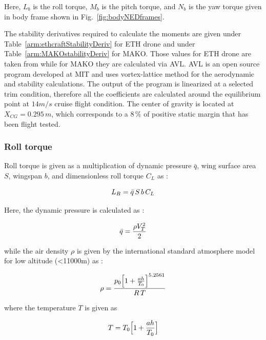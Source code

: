 Here, $L_b$ is the roll torque, $M_b$ is the pitch torque, and $N_b$ is the yaw torque given in body frame shown in Fig.~\ref{fig:bodyNEDframes}.

The stability derivatives required to calculate the moments are given under Table~\ref{arm:ethcraftStabilityDeriv} for ETH drone and under Table~\ref{arm:MAKOstabilityDeriv} for MAKO. 
Those values for ETH drone are taken from \cite{ducard2009fault} while for MAKO they are calculated via AVL. 
AVL is an open source program developed at MIT and uses vortex-lattice method for the aerodynamic and stability calculations.
The output of the program is linearized at a selected trim condition, therefore all the coefficients are calculated around the equilibrium point at $14m/s$ cruise flight condition.
The center of gravity is located at $X_{CG}= 0.295\,m$, which corresponds to a $8\,\%$ of positive static margin that has been flight tested. %

\subsubsection{Roll torque}

Roll torque is given as a multiplication of dynamic pressure $\bar{q}$, wing surface area $S$, wingspan $b$,  and dimensionless roll torque $C_L$ as :

\begin{equation}{\label{eqn:rollTorque}}
L_B = \bar{q} \, S \, b \, C_L
\end{equation}

Here, the dynamic pressure is calculated as :

\begin{equation}{\label{eqn:dynamicPressure}}
\bar{q}=\frac{\rho V_T^2}{2} 
\end{equation}

while the air density $\rho$ is given by the international standard atmosphere model for low altitude (<11000m) as :

\begin{equation}{\label{eqn:airDensityStandard}}
\rho = \frac{p_0 \Big[ 1+\frac{ah}{T_0} \Big]^{5.2561}}{R\,T}
\end{equation}

where the temperature $T$ is given as

\begin{equation}{\label{eqn:temperature}}
T=T_0\Big[ 1 + \frac{ah}{T_0} \Big]
\end{equation}

